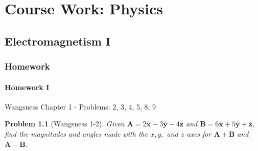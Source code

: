 \documentclass[oneside]{book}
\theoremstyle{mystyle}
\newtheorem{problem}{Problem}[section]
\begin{document}
\part{Course Work: Physics}
\chapter{Electromagnetism I}
\section{Homework}
\subsection{Homework I}
Wangsness Chapter 1 - Problems: 2, 3, 4, 5, 8, 9
\begin{problem}[Wangsness 1-2]
Given $\mathbf{A} = 2\hat{\mathbf{x}}-3\hat{\mathbf{y}}-4\hat{\mathbf{z}}$ and $\mathbf{B} = 6\hat{\mathbf{x}}+5\hat{\mathbf{y}}+\hat{\mathbf{z}}$, find the magnitudes and angles made with the $x,y,$ and $z$ axes for $\mathbf{A}+\mathbf{B}$ and $\mathbf{A}-\mathbf{B}$.
\end{problem}
\end{document}
